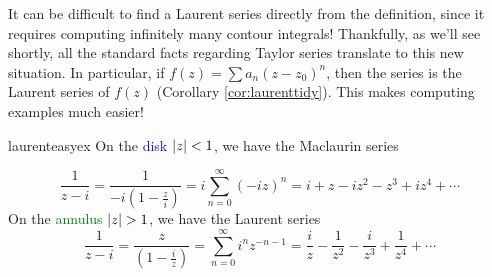 \goodbreak

It can be difficult to find a Laurent series directly from the definition, since it requires computing infinitely many contour integrals! Thankfully, as we'll see shortly, all the standard facts regarding Taylor series translate to this new situation. In particular, if $f(z)=\sum a_n(z-z_0)^n$, then the series is the Laurent series of $f(z)$ (Corollary \ref{cor:laurenttidy}). This makes computing examples much easier!


\begin{examples}{}{laurenteasyex}
	\exstart On the \textcolor{blue}{disk $\left| z\right|<1$}, we have the Maclaurin series
	
	\begin{enumerate}\setcounter{enumi}{1}
	  \begin{minipage}[t]{0.73\linewidth}\vspace{-13pt}
		  \item[]%
		  \[
		  	\frac 1{z-i}=\frac 1{-i(1-\frac zi)}
		  	=i\sum_{n=0}^\infty(-iz)^n
		  	=i+z-iz^2-z^3+iz^4+\cdots
		  \]
			On the \textcolor{Green}{annulus $\nm z>1$}, we have the Laurent series
			\[
				\frac 1{z-i}=\frac z{(1-\frac iz)}
				=\sum_{n=0}^\infty i^nz^{-n-1}
				=\frac iz-\frac 1{z^2}-\frac i{z^3}+\frac 1{z^4}+\cdots
			\]
		

\end{minipage}
\end{enumerate}
\end{examples}
